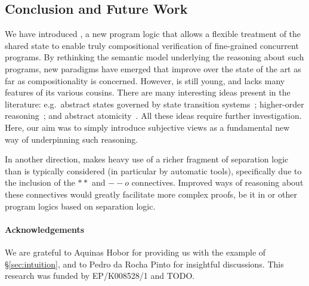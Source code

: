 \subsection*{Conclusion and Future Work}

We have introduced \colosl, a new program logic that allows a flexible
treatment of the shared state to enable truly compositional
verification of fine-grained concurrent programs. By rethinking the
semantic model underlying the reasoning about such programs, new
paradigms have emerged that improve over the state of the art as far
as compositionality is concerned. However, \colosl is still young, and
lacks many features of its various cousins.  There are many
interesting ideas present in the literature: e.g.\ abstract states
governed by state transition systems~\cite{caresl}; higher-order
reasoning~\cite{icap}; and abstract atomicity~\cite{tada}. All these
ideas require further investigation. Here, our aim was to simply
introduce subjective views as a fundamental new way of underpinning such reasoning.

In another direction, \colosl makes heavy use of a richer fragment
of separation logic than is typically considered (in particular by
automatic tools), specifically due to the inclusion of the $**$ and
$--o$ connectives. Improved ways of reasoning about these connectives
would greatly facilitate more complex proofs, be it in \colosl or
other program logics based on separation logic.


\paragraph{Acknowledgements}
We are grateful to Aquinas Hobor for providing us with the example of
\S\ref{sec:intuition}, and to Pedro da Rocha Pinto for insightful
discussions. This research was funded by EP/K008528/1 and TODO.
